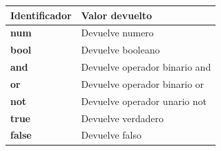 \documentclass{article}
\begin{document}
\begin{center}
    \begin{tabular}{ | p{5cm} | p{5cm} |}
    \hline
    Identificador & Valor devuelto \\ \hline
		\textbf{num} & Devuelve numero \\ \hline
		\textbf{bool} & Devuelve booleano \\ \hline
		\textbf{and} & Devuelve operador binario and \\ \hline
		\textbf{or} & Devuelve operador binario or \\ \hline
		\textbf{not} & Devuelve operador unario not\\ \hline
		\textbf{true} & Devuelve verdadero \\ \hline
		\textbf{false} & Devuelve falso \\ \hline

    \end{tabular}
\end{center}
\end{document}
